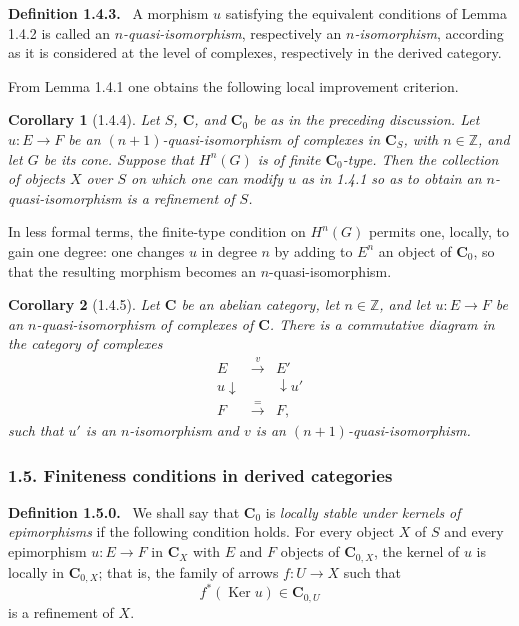 \documentclass[14pt]{extarticle}
\newcommand{\ZZ}{\mathbb Z}
\newcommand{\Ker}{\operatorname{Ker}}
\newenvironment{statement}[1]{\par\medskip\noindent\textbf{#1.}\ }{\par\medskip}
\newtheorem*{corollary*}{Corollary}
\begin{document}
\begin{statement}{Definition 1.4.3}
A morphism $u$ satisfying the equivalent conditions of Lemma 1.4.2 is called an \emph{$n$-quasi-isomorphism}, respectively an \emph{$n$-isomorphism}, according as it is considered at the level of complexes, respectively in the derived category.
\end{statement}

From Lemma 1.4.1 one obtains the following local improvement criterion.

\begin{corollary*}[1.4.4]
Let $S$, $\mathbf C$, and $\mathbf C_0$ be as in the preceding discussion. Let $u:E\to F$ be an $(n+1)$-quasi-isomorphism of complexes in $\mathbf C_S$, with $n\in\ZZ$, and let $G$ be its cone. Suppose that $H^n(G)$ is of finite $\mathbf C_0$-type. Then the collection of objects $X$ over $S$ on which one can modify $u$ as in 1.4.1 so as to obtain an $n$-quasi-isomorphism is a refinement of $S$.
\end{corollary*}

In less formal terms, the finite-type condition on $H^n(G)$ permits one, locally, to gain one degree: one changes $u$ in degree $n$ by adding to $E^n$ an object of $\mathbf C_0$, so that the resulting morphism becomes an $n$-quasi-isomorphism.

\begin{corollary*}[1.4.5]
Let $\mathbf C$ be an abelian category, let $n\in\ZZ$, and let $u:E\to F$ be an $n$-quasi-isomorphism of complexes of $\mathbf C$. There is a commutative diagram in the category of complexes
\[
\begin{array}{ccc}
E & \xrightarrow{v} & E'\\
u\downarrow & & \downarrow u'\\
F & \xrightarrow{=} & F,
\end{array}
\]
such that $u'$ is an $n$-isomorphism and $v$ is an $(n+1)$-quasi-isomorphism.
\end{corollary*}

\subsubsection*{1.5. Finiteness conditions in derived categories}

\begin{statement}{Definition 1.5.0}
We shall say that $\mathbf C_0$ is \emph{locally stable under kernels of epimorphisms} if the following condition holds. For every object $X$ of $S$ and every epimorphism $u:E\to F$ in $\mathbf C_X$ with $E$ and $F$ objects of $\mathbf C_{0,X}$, the kernel of $u$ is locally in $\mathbf C_{0,X}$; that is, the family of arrows $f:U\to X$ such that
\[
   f^*(\Ker u)\in\mathbf C_{0,U}
\]
is a refinement of $X$.
\end{statement}
\end{document}
